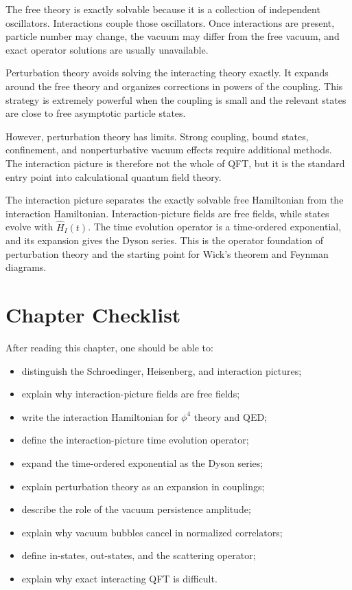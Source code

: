 The free theory is exactly solvable because it is a collection of independent
oscillators. Interactions couple those oscillators. Once interactions are
present, particle number may change, the vacuum may differ from the free vacuum,
and exact operator solutions are usually unavailable.

Perturbation theory avoids solving the interacting theory exactly. It expands
around the free theory and organizes corrections in powers of the coupling.
This strategy is extremely powerful when the coupling is small and the relevant
states are close to free asymptotic particle states.

However, perturbation theory has limits. Strong coupling, bound states,
confinement, and nonperturbative vacuum effects require additional methods. The
interaction picture is therefore not the whole of QFT, but it is the standard
entry point into calculational quantum field theory.

\begin{summarybox}
The interaction picture separates the exactly solvable free Hamiltonian from the
interaction Hamiltonian. Interaction-picture fields are free fields, while
states evolve with \(\hat H_I(t)\). The time evolution operator is a
time-ordered exponential, and its expansion gives the Dyson series. This is the
operator foundation of perturbation theory and the starting point for Wick's
theorem and Feynman diagrams.
\end{summarybox}

\section{Chapter Checklist}

After reading this chapter, one should be able to:
\begin{itemize}
    \item distinguish the Schroedinger, Heisenberg, and interaction pictures;
    \item explain why interaction-picture fields are free fields;
    \item write the interaction Hamiltonian for \(\phi^4\) theory and QED;
    \item define the interaction-picture time evolution operator;
    \item expand the time-ordered exponential as the Dyson series;
    \item explain perturbation theory as an expansion in couplings;
    \item describe the role of the vacuum persistence amplitude;
    \item explain why vacuum bubbles cancel in normalized correlators;
    \item define in-states, out-states, and the scattering operator;
    \item explain why exact interacting QFT is difficult.
\end{itemize}
